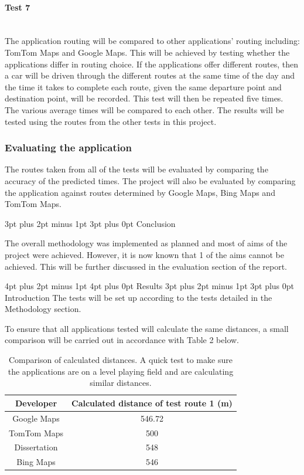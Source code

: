 \documentclass[12pt,a4paper]{article}
\makeatletter
\renewcommand\subsection{\@startsection {subsection}{1}{0mm} %
                               {3pt plus 2pt minus 1pt} %
                               {3pt plus 0pt} %
                               {\normalfont\bfseries}}
\renewcommand\section{\@startsection {section}{1}{0mm} %
                               {4pt plus 2pt minus 1pt} %
                               {4pt plus 0pt} %
                               {\Large\bfseries}}
\newcommand{\myparagraph}[1]{\paragraph{#1}\mbox{}\\}
\makeatother
\begin{document}
\myparagraph{Test 7}
The application routing will be compared to other applications' routing including: TomTom Maps and Google Maps. This will be achieved by testing whether the applications differ in routing choice. If the applications offer different routes, then a car will be driven through the different routes at the same time of the day and the time it takes to complete each route, given the same departure point and destination point, will be recorded. This test will then be repeated five times. The various average times will be compared to each other. The results will be tested using the routes from the other tests in this project.

\subsubsection{Evaluating the application}

The routes taken from all of the tests will be evaluated by comparing the accuracy of the predicted times.
The project will also be evaluated by comparing the application against routes determined by Google Maps, Bing Maps and TomTom Maps.

\subsection{Conclusion}

The overall methodology was implemented as planned and most of aims of the project were achieved. However, it is now known that 1 of the aims cannot be achieved. This will be further discussed in the evaluation section of the report.

\newpage
\section{Results}
\subsection{Introduction}
The tests will be set up according to the tests detailed in the Methodology section. 

To ensure that all applications tested will calculate the same distances, a small comparison will be carried out in accordance with Table 2 below.   

\begin{table}[h]
	\caption{Comparison of calculated distances. A quick test to make sure the applications are on a level playing field and are calculating similar distances.}
	\begin{tabular}{@{}cc@{}}
		\toprule
		Developer    & Calculated distance of test route 1 (m) \\ \midrule
		Google Maps  & 546.72                                  \\
		TomTom Maps  & 500                                     \\
		Dissertation & 548                                     \\
		Bing Maps    & 546                                     \\ \bottomrule
	\end{tabular}
\end{table}
\newpage
\end{document}
